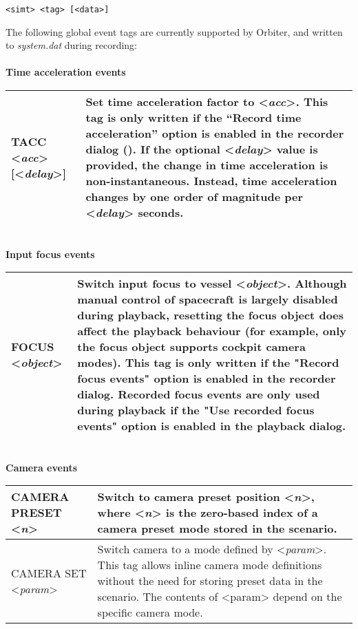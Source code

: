 \documentclass[Orbiter Technical Reference.tex]{subfiles}
\begin{document}
\begin{lstlisting}[language=OSFS]
<simt> <tag> [<data>]
\end{lstlisting}

\noindent
The following global event tags are currently supported by Orbiter, and written to \textit{system.dat} during recording:\\
\\
\textbf{Time acceleration events}

\begin{table}[H]
	\centering
	\begin{tabularx}{\textwidth}{ |l|X| }
	\hline\rule{0pt}{2ex}
	TACC <\textit{acc}> [<\textit{delay}>] & Set time acceleration factor to <\textit{acc}>. This tag is only written if  the “Record time acceleration” option is enabled in the recorder dialog (\Ctrl\keystroke{F5}). If the optional <\textit{delay}> value is provided, the change in time acceleration is non-instantaneous. Instead, time acceleration changes by one order of magnitude per <\textit{delay}> seconds.\\
	\hline
	\end{tabularx}
\end{table}

\noindent
\\
\textbf{Input focus events}

\begin{table}[H]
	\centering
	\begin{tabularx}{\textwidth}{ |l|X| }
	\hline\rule{0pt}{2ex}
	FOCUS <\textit{object}> & Switch input focus to vessel <\textit{object}>. Although manual control of spacecraft is largely disabled during playback, resetting the focus object does affect the playback behaviour (for example, only the focus object supports cockpit camera modes).\newline
	This tag is only written if the "Record focus events" option is enabled in the recorder dialog.\newline
	Recorded focus events are only used during playback if the "Use recorded focus events" option is enabled in the playback dialog.\\
	\hline
	\end{tabularx}
\end{table}

\noindent
\\
\textbf{Camera events}

\begin{table}[H]
	\centering
	\begin{tabularx}{\textwidth}{ |l|X| }
	\hline\rule{0pt}{2ex}
	CAMERA PRESET <\textit{n}> & Switch to camera preset position <\textit{n}>, where <\textit{n}> is the zero-based index of a camera preset mode stored in the scenario.\\
	\hline\rule{0pt}{2ex}
	CAMERA SET <\textit{param}> & Switch camera to a mode defined by <\textit{param}>. This tag allows inline camera mode definitions without the need for storing preset data in the scenario. The contents of <param> depend on the specific camera mode.\\
	\hline
	\end{tabularx}
\end{table}
\end{document}
